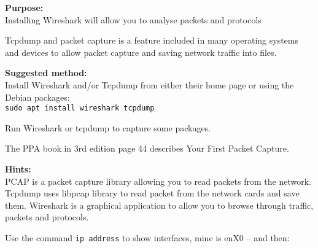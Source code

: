 \documentclass[a4paper,11pt,notitlepage]{report}
\begin{document}
{\bf Purpose:}\\
Installing Wireshark will allow you to analyse packets and protocols

Tcpdump and packet capture is a feature included in many operating systems and devices to allow packet capture and saving network traffic into files.

{\bf Suggested method:}\\
Install Wireshark and/or Tcpdump from either their home page or using the Debian packages:\\
\verb+sudo apt install wireshark tcpdump+

Run Wireshark or tcpdump to capture some packages.

The PPA book in 3rd edition page 44 describes Your First Packet Capture.

{\bf Hints:}\\
PCAP is a packet capture library allowing you to read packets from the network.
Tcpdump uses libpcap library to read packet from the network cards and save them.
Wireshark is a graphical application to allow you to browse through traffic, packets and protocols.

Use the command \verb+ip address+ to show interfaces, mine is enX0 -- and then:
\end{document}
